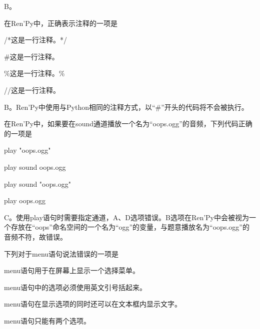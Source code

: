 \documentclass[../Exercises.tex]{subfiles}
\begin{document}
    \begin{solution}[pre-analysis=【答案】]
        B。
    \end{solution}

    \begin{question}
        在Ren'Py中，正确表示注释的一项是\paren
        \begin{choices}
            \item /*这是一行注释。*/
            \item \#这是一行注释。
            \item \%这是一行注释。\%
            \item //这是一行注释。
        \end{choices}
    \end{question}

    \begin{solution}[pre-analysis=【答案】]
        B。Ren'Py中使用与Python相同的注释方式，以“\#”开头的代码将不会被执行。
    \end{solution}

    \begin{question}
        在Ren'Py中，如果要在sound通道播放一个名为“oops.ogg”的音频，下列代码正确的一项是\paren
        \begin{choices}
            \item \textsf{play "oops.ogg"}
            \item \textsf{play sound oops.ogg}
            \item \textsf{play sound "oops.ogg"}
            \item \textsf{play oops.ogg}
        \end{choices}
    \end{question}

    \begin{solution}
        C。使用play语句时需要指定通道，A、D选项错误。B选项在Ren'Py中会被视为一个存放在“oops”命名空间的一个名为“ogg”的变量，与题意播放名为“oops.ogg”的音频不符，故错误。
    \end{solution}

    \begin{question}
        下列对于menu语句说法错误的一项是\paren
        \begin{choices}
            \item menu语句用于在屏幕上显示一个选择菜单。
            \item menu语句中的选项必须使用英文引号括起来。
            \item menu语句在显示选项的同时还可以在文本框内显示文字。
            \item menu语句只能有两个选项。
        \end{choices}
    \end{question}
\end{document}
